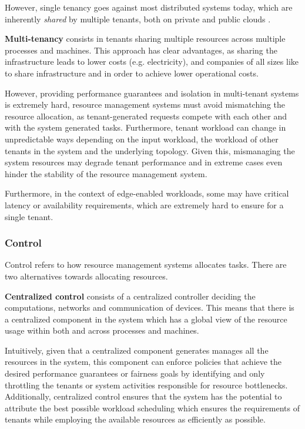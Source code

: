 However, single tenancy goes against most distributed systems today, which are inherently \emph{shared} by multiple tenants, both on private and public clouds \cite{mace2015retro}.

\textbf{Multi-tenancy} consists in tenants sharing multiple resources across multiple processes and machines. This approach has clear advantages, as sharing the infrastructure leads to lower costs (e.g. electricity), and companies of all sizes like to share infrastructure and in order to achieve lower operational costs. 

However, providing performance guarantees and isolation in multi-tenant systems is extremely hard, resource management systems must avoid mismatching the resource allocation, as tenant-generated requests compete with each other and with the system generated tasks. Furthermore, tenant workload can change in unpredictable ways depending on the input workload, the workload of other tenants in the system and the underlying topology. Given this, mismanaging the system resources may degrade tenant performance and in extreme cases even hinder the stability of the resource management system.

Furthermore, in the context of edge-enabled workloads, some may have critical latency or availability requirements, which are extremely hard to ensure for a single tenant.

\subsubsection{Control}

Control refers to how resource management systems allocates tasks. There are two alternatives towards allocating resources.

\textbf{Centralized control} consists of a centralized controller deciding the computations, networks and communication of devices. This means that there is a centralized component in the system which has a global view of the resource usage within both and across processes and machines.

Intuitively, given that a centralized component generates manages all the resources in the system, this component can enforce policies that achieve the desired performance guarantees or fairness goals by identifying and only throttling the tenants or system activities responsible for resource bottlenecks. \cite{verma2015large} Additionally, centralized control ensures that the system has the potential to attribute the best possible workload scheduling which ensures the requirements of tenants while employing the available resources as efficiently as possible.


